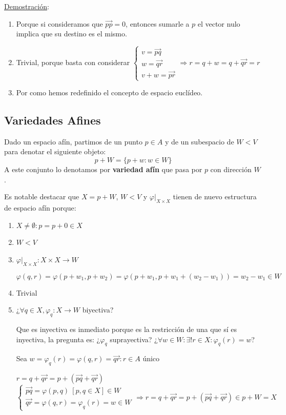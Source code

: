 \documentclass[10pt,a4paper,openright]{book}
\theoremstyle{break}
\begin{document}
\underline{Demostración}:
\begin{enumerate}
\item Porque si consideramos que $\vec{pp}= 0$, entonces sumarle a $p$ el vector nulo implica que su destino es el mismo.

\item Trivial, porque basta con considerar $\begin{cases} v = \vec{pq} \\ w = \vec{qr} \\ v + w = \vec{pr} \end{cases} \Rightarrow r = q + w = q + \vec{qr} = r$

\item Por como hemos redefinido el concepto de espacio euclídeo.
\end{enumerate}

\subsection{Variedades Afines}
Dado un espacio afín, partimos de un punto $p \in A$ y de un subespacio de $W < V$ para denotar el siguiente objeto:
$$p + W = \{p + w : w \in W\}$$
A este conjunto lo denotamos por \textbf{variedad afín} que pasa por $p$ con dirección $W$.

Es notable destacar que $X = p + W$, $W<V$ y $\varphi|_{X \times X}$ tienen de nuevo estructura de espacio afín porque:
\begin{enumerate}
\item $X \neq\emptyset : p = p + 0 \in X $

\item $W < V$

\item $\varphi|_{X \times X} : X \times X \to W$

$$\varphi(q,r) = \varphi (p + w_1, p + w_2) = \varphi(p + w_1, p + w_1 + (w_2 - w_1)) = w_2 - w_1 \in W$$

\item Trivial

\item ¿$\forall q\in X, \varphi_q : X \to W $ biyectiva?

Que es inyectiva es inmediato porque es la restricción de una que sí es inyectiva, la pregunta es: ¿$ \varphi_q $ suprayectiva? ¿$\forall w \in W : \exists! r \in X: \varphi_q (r) = w$?

Sea $w =  \varphi_q (r)=\varphi(q,r) = \vec{qr} : r \in A$ único

$r= q + \vec{qr} = p + (\vec{pq} + \vec{qr})$
$$\begin{cases} \vec{pq} = \varphi(p,q) \ [p,q \in X] \in W \\ \vec{qr} = \varphi(q,r) = \varphi_q(r) = w \in W\end{cases} \Rightarrow r= q + \vec{qr} = p + (\vec{pq} + \vec{qr}) \in p + W = X$$
\end{enumerate}
\end{document}
